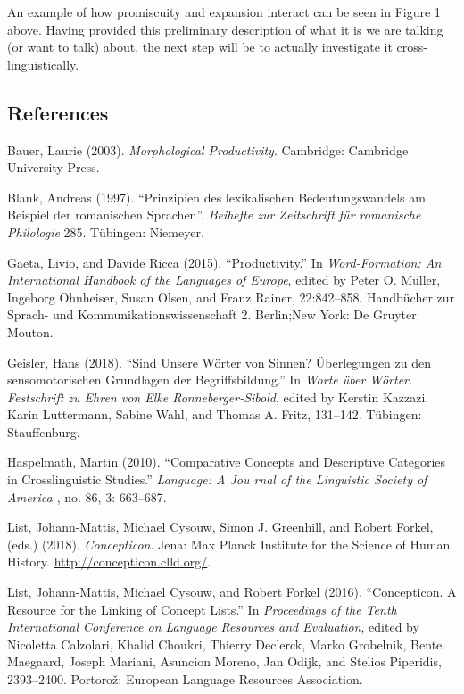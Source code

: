 \documentclass[
  a4paper,
  14pt,
  oneside,
  tablecaptionabove
]{scrbook}
\begin{document}
An example of how
promiscuity and expansion interact can be seen in Figure 1 above. Having
provided this preliminary description of what it is we are talking (or
want to talk) about, the next step will be to actually investigate it
cross-linguistically.

\subsection*{References}

\nopagebreak\hangindent=0.7cm {\small Bauer, Laurie (2003). \emph{Morphological Productivity}.  Cambridge:
Cambridge University Press. }

\nopagebreak\hangindent=0.7cm {\small Blank, Andreas (1997). ``Prinzipien des lexikalischen
Bedeutungswandels am Beispiel der romanischen Sprachen''.  \emph{Beihefte zur
Zeitschrift für romanische Philologie} 285. Tübingen: Niemeyer. }

\nopagebreak\hangindent=0.7cm {\small Gaeta, Livio, and Davide Ricca (2015). \enquote{Productivity.} In
\emph{Word-Formation: An International Handbook of the Languages of
Europe}, edited by Peter O. Müller, Ingeborg Ohnheiser, Susan Olsen,
and Franz Rainer, 22:842--858. Handbücher zur Sprach- und
Kommunikationswissenschaft 2. Berlin;New York: De Gruyter Mouton. }

\nopagebreak\hangindent=0.7cm {\small Geisler, Hans (2018). \enquote{Sind Unsere Wörter von Sinnen?
Überlegungen zu den sensomotorischen Grundlagen der Begriffsbildung.} In
\emph{Worte über Wörter. Festschrift zu Ehren von Elke
Ronneberger-Sibold}, edited by Kerstin Kazzazi, Karin Luttermann,
Sabine Wahl, and Thomas A. Fritz, 131--142. Tübingen: Stauffenburg. }

\nopagebreak\hangindent=0.7cm {\small Haspelmath, Martin (2010). \enquote{Comparative Concepts and
Descriptive Categories in Crosslinguistic Studies.} \emph{Language: A
Jou { rnal of the Linguistic Society of America }}, no. 86, 3:
663--687. }

\nopagebreak\hangindent=0.7cm {\small List, Johann-Mattis, Michael Cysouw, Simon J. Greenhill, and Robert
Forkel, (eds.) (2018). \emph{Concepticon}.  Jena: Max Planck Institute for
the Science of Human History. \url{http://concepticon.clld.org/}.  }

\nopagebreak\hangindent=0.7cm {\small List, Johann-Mattis, Michael Cysouw, and Robert Forkel (2016).
\enquote{Concepticon. A Resource for the Linking of Concept Lists.} In
\emph{Proceedings of the Tenth International Conference on Language
Resources and Evaluation}, edited by Nicoletta Calzolari, Khalid
Choukri, Thierry Declerck, Marko Grobelnik, Bente Maegaard, Joseph
Mariani, Asuncion Moreno, Jan Odijk, and Stelios Piperidis, 2393--2400.
Portorož: European Language Resources Association. }
\end{document}
